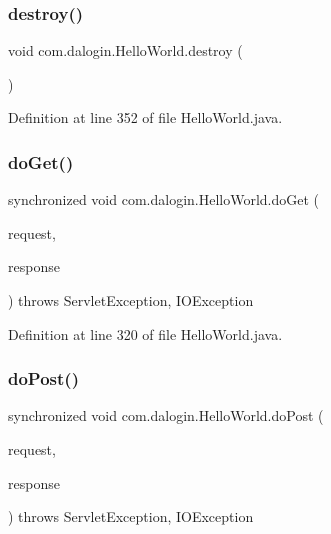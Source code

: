 \subsubsection{\texorpdfstring{destroy()}{destroy()}}
{\footnotesize\ttfamily void com.\+dalogin.\+Hello\+World.\+destroy (\begin{DoxyParamCaption}{ }\end{DoxyParamCaption})}



Definition at line 352 of file Hello\+World.\+java.

\mbox{\label{classcom_1_1dalogin_1_1_hello_world_ac32fae0ca47965646d7f65001995f9a4}} 
\subsubsection{\texorpdfstring{do\+Get()}{doGet()}}
{\footnotesize\ttfamily synchronized void com.\+dalogin.\+Hello\+World.\+do\+Get (\begin{DoxyParamCaption}\item[{Http\+Servlet\+Request}]{request,  }\item[{Http\+Servlet\+Response}]{response }\end{DoxyParamCaption}) throws Servlet\+Exception, I\+O\+Exception}



Definition at line 320 of file Hello\+World.\+java.

\mbox{\label{classcom_1_1dalogin_1_1_hello_world_a5743fb630d7e93946a8d0fd1e8ff6fa1}} 
\subsubsection{\texorpdfstring{do\+Post()}{doPost()}}
{\footnotesize\ttfamily synchronized void com.\+dalogin.\+Hello\+World.\+do\+Post (\begin{DoxyParamCaption}\item[{Http\+Servlet\+Request}]{request,  }\item[{Http\+Servlet\+Response}]{response }\end{DoxyParamCaption}) throws Servlet\+Exception, I\+O\+Exception}

